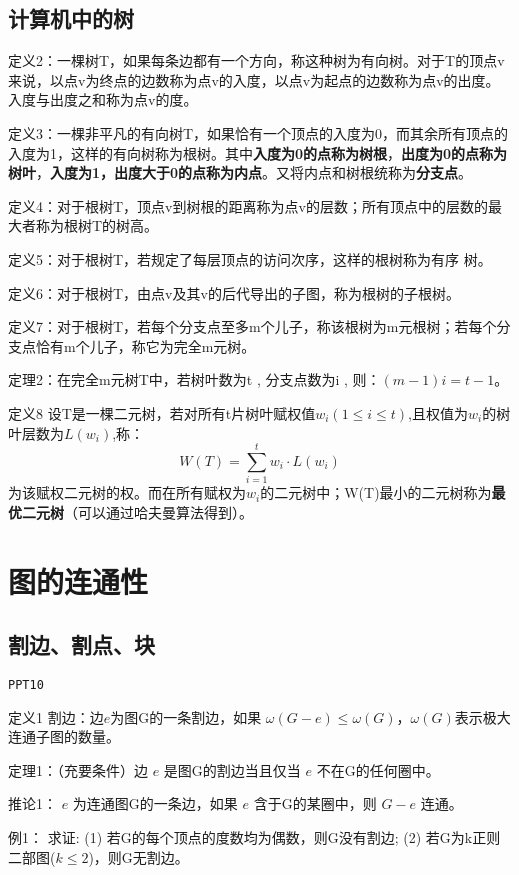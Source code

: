 \documentclass{article}
\begin{document}
\subsection{计算机中的树}

定义2：一棵树T，如果每条边都有一个方向，称这种树为有向树。对于T的顶点v来说，以点v为终点的边数称为点v的入度，以点v为起点的边数称为点v的出度。入度与出度之和称为点v的度。

定义3：一棵非平凡的有向树T，如果恰有一个顶点的入度为0，而其余所有顶点的入度为1，这样的有向树称为根树。其中\textbf{入度为0的点称为树根}，\textbf{出度为0的点称为树叶}，\textbf{入度为1，出度大于0的点称为内点}。又将内点和树根统称为\textbf{分支点}。

定义4：对于根树T，顶点v到树根的距离称为点v的层数；所有顶点中的层数的最大者称为根树T的树高。

定义5：对于根树T，若规定了每层顶点的访问次序，这样的根树称为有序
树。

定义6：对于根树T，由点v及其v的后代导出的子图，称为根树的子根树。

定义7：对于根树T，若每个分支点至多m个儿子，称该根树为m元根树；若每个分支点恰有m个儿子，称它为完全m元树。

定理2：在完全m元树T中，若树叶数为t , 分支点数为i , 则：$(m-1)i=t-1$。

定义8 设T是一棵二元树，若对所有t片树叶赋权值$w_i(1\le i \le t)$,且权值为$w_i$的树叶层数为$L(w_i)$,称：
$$ W(T) = \sum_{i = 1}^{t}w_i\cdot L(w_i)$$ 
为该赋权二元树的权。而在所有赋权为$w_i$的二元树中；W(T)最小的二元树称为\textbf{最优二元树}（可以通过哈夫曼算法得到）。

\section{图的连通性}

\subsection{割边、割点、块}

\texttt{PPT10}

定义1 割边：边$e$为图G的一条割边，如果 $\omega(G-e) \le \omega(G)$，$\omega(G)$表示极大连通子图的数量。

定理1：（充要条件）边 $e$ 是图G的割边当且仅当 $e$ 不在G的任何圈中。

推论1： $e$ 为连通图G的一条边，如果 $e$ 含于G的某圈中，则 $G-e$ 连通。

例1： 求证: (1) 若G的每个顶点的度数均为偶数，则G没有割边; (2) 若G为k正则二部图($k\le2$)，则G无割边。
\end{document}
